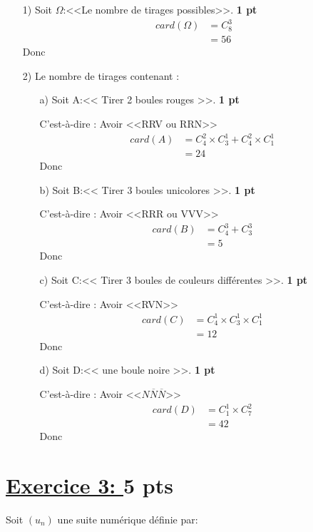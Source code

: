 \documentclass[12pt]{article}
\begin{document}
\begin{itemize}
\item[1)] Soit $\Omega$:<<Le nombre de tirages possibles>>. \textbf{1 pt}
\begin{align*}
card(\Omega)&=C_{8}^{3}\\
		&=56	
\end{align*}
Donc \textcolor{green}{}
\item[2)] Le nombre de tirages contenant :
\begin{itemize}
\item[a)] Soit A:<< Tirer 2 boules rouges >>. \textbf{1 pt}

C'est-à-dire : Avoir <<RRV ou RRN>>
\begin{align*}
card(A)&=C_{4}^{2}\times C_{3}^{1}+C_{4}^{2}\times C_{1}^{1}\\
		&=24
\end{align*}
Donc \textcolor{green}{}
\item[b)] Soit B:<< Tirer 3 boules unicolores >>. \textbf{1 pt}

C'est-à-dire : Avoir <<RRR ou VVV>>
\begin{align*}
card(B)&=C_{4}^{3}+C_{3}^{3}\\
	&=5
\end{align*}
Donc \textcolor{green}{}
\item[c)] Soit C:<< Tirer 3 boules de couleurs différentes >>. \textbf{1 pt}

C'est-à-dire : Avoir <<RVN>>
\begin{align*}
card(C)&=C_{4}^{1} \times C_{3}^{1} \times C_{1}^{1}\\
		&=12
\end{align*}
Donc \textcolor{green}{}
\item[d)] Soit D:<< une boule noire >>. \textbf{1 pt}

C'est-à-dire : Avoir <<$N\overline{N}\overline{N}$>>
\begin{align*}
card(D)&=C_{1}^{1} \times C_{7}^{2}\\
		&=42
\end{align*}
Donc \textcolor{green}{}
\end{itemize}
\end{itemize}
\section*{\underline{Exercice 3: }\textbf{5 pts}}
Soit $(u_n)$ une suite numérique définie par:
\end{document}
